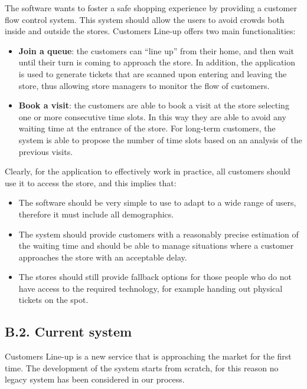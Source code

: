 The software wants to foster a safe shopping experience by providing a customer flow control system. This system should allow the users to avoid crowds both inside and outside the stores. Customers Line-up offers two main functionalities:

\begin{itemize}
\item
  \textbf{Join a queue}: the customers can ``line up'' from their home, and then wait until their turn is coming to approach the store. In addition, the application is used to generate tickets that are scanned upon entering and leaving the store, thus allowing store managers to monitor the flow of customers.
  
\clearpage
\item
  \textbf{Book a visit}: the customers are able to book a visit at the store selecting one or more consecutive time slots. In this way they are able to avoid any waiting time at the entrance of the store. For long-term customers, the system is able to propose the number of time slots based on an analysis of the previous visits.
\end{itemize}

Clearly, for the application to effectively work in practice, all customers should use it to access the store, and this implies that:

\begin{itemize}
\item
  The software should be very simple to use to adapt to a wide range of users, therefore it must include all demographics.
\item
  The system should provide customers with a reasonably precise estimation of the waiting time and should be able to manage situations where a customer approaches the store with an acceptable delay.
\item
  The stores should still provide fallback options for those people who do not have access to the required technology, for example handing out physical tickets on the spot.
\end{itemize}

\subsection{B.2. Current system}

Customers Line-up is a new service that is approaching the market for the first time. The development of the system starts from scratch, for this reason no legacy system has been considered in our process.

